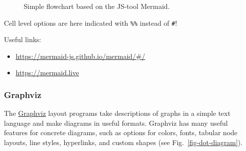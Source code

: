 \documentclass[
  letterpaper,
  DIV=11,
  numbers=noendperiod]{scrartcl}
\providecommand{\tightlist}{%
  \setlength{\itemsep}{0pt}\setlength{\parskip}{0pt}}\usepackage{longtable,booktabs,array}
\begin{document}
\begin{figure}


\caption{\label{fig-mermaid-diagram}Simple flowchart based on the
JS-tool Mermaid.}

\end{figure}%

\begin{tcolorbox}[enhanced jigsaw, toprule=.15mm, colbacktitle=quarto-callout-note-color!10!white, colback=white, rightrule=.15mm, left=2mm, title=\textcolor{quarto-callout-note-color}{\faInfo}\hspace{0.5em}{Note}, colframe=quarto-callout-note-color-frame, breakable, bottomtitle=1mm, opacitybacktitle=0.6, opacityback=0, bottomrule=.15mm, arc=.35mm, coltitle=black, leftrule=.75mm, toptitle=1mm, titlerule=0mm]

Cell level options are here indicated with \texttt{\%\%\textbar{}}
instead of \texttt{\#\textbar{}}!

\end{tcolorbox}

Useful links:

\begin{itemize}
\tightlist
\item
  \url{https://mermaid-js.github.io/mermaid/\#/}
\item
  \url{https://mermaid.live}
\end{itemize}

\subsubsection{Graphviz}\label{graphviz}

The \href{https://graphviz.org/}{Graphviz} layout programs take
descriptions of graphs in a simple text language and make diagrams in
useful formats. Graphviz has many useful features for concrete diagrams,
such as options for colors, fonts, tabular node layouts, line styles,
hyperlinks, and custom shapes (see Fig.~\ref{fig-dot-diagram}).
\end{document}
